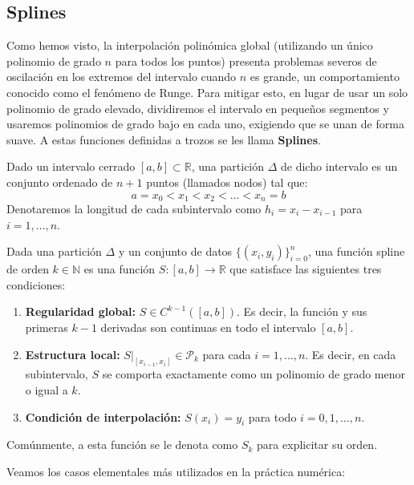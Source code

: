 \subsection{Splines}

Como hemos visto, la interpolación polinómica global (utilizando un único polinomio de grado $n$ para todos los puntos) presenta problemas severos de oscilación en los extremos del intervalo cuando $n$ es grande, un comportamiento conocido como el fenómeno de Runge. Para mitigar esto, en lugar de usar un solo polinomio de grado elevado, dividiremos el intervalo en pequeños segmentos y usaremos polinomios de grado bajo en cada uno, exigiendo que se unan de forma suave. A estas funciones definidas a trozos se les llama \textbf{Splines}.

\begin{definición}
    Dado un intervalo cerrado $[a,b] \subset \mathbb{R}$, una partición $\Delta$ de dicho intervalo es un conjunto ordenado de $n+1$ puntos (llamados nodos) tal que:
    \[
        a = x_0 < x_1 < x_2 < \ldots < x_n = b
    \]
    Denotaremos la longitud de cada subintervalo como $h_i = x_i - x_{i-1}$ para $i = 1, \dots, n$.
\end{definición}

\begin{definición}
    Dada una partición $\Delta$ y un conjunto de datos $\{ (x_i, y_i) \}_{i=0}^n$, una función spline de orden $k \in \mathbb{N}$ es una función $S : [a,b] \to \mathbb{R}$ que satisface las siguientes tres condiciones:
    \begin{enumerate}
        \item \textbf{Regularidad global:} $S \in C^{k-1}([a,b])$. Es decir, la función y sus primeras $k-1$ derivadas son continuas en todo el intervalo $[a,b]$.
        \item \textbf{Estructura local:} $S \big|_{[x_{i-1}, x_i]} \in \mathcal{P}_k$ para cada $i = 1, \dots, n$. Es decir, en cada subintervalo, $S$ se comporta exactamente como un polinomio de grado menor o igual a $k$.
        \item \textbf{Condición de interpolación:} $S(x_i) = y_i$ para todo $i = 0, 1, \ldots, n$.
    \end{enumerate}
    Comúnmente, a esta función se le denota como $S_k$ para explicitar su orden.
\end{definición}

Veamos los casos elementales más utilizados en la práctica numérica:\\

